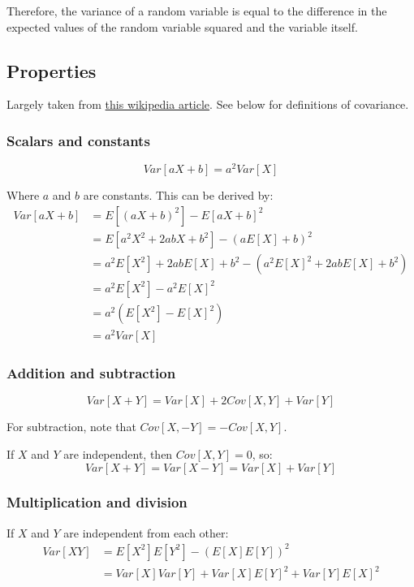 \documentclass[12pt]{article}
\begin{document}
Therefore, the variance of a random variable is equal to the difference in the expected values of the random variable squared and the variable itself.

\subsection{Properties}

Largely taken from \href{https://en.wikipedia.org/wiki/Algebra_of_random_variables}{this wikipedia article}. See below for definitions of covariance.

\subsubsection{Scalars and constants}
$$ Var[aX + b] = a^2 Var[X] $$
    
Where $a$ and $b$ are constants.
This can be derived by:
\begin{align*}
    Var[aX + b] &= E[(aX + b)^2] - E[aX + b]^2 \\
    &= E[a^2 X^2 + 2abX + b^2] - (aE[X] + b)^2 \\
    &= a^2 E[X^2] + 2abE[X] + b^2 - (a^2 E[X]^2 + 2abE[X] + b^2) \\
    &= a^2 E[X^2] - a^2 E[X]^2 \\
    &= a^2 (E[X^2] - E[X]^2) \\
    &= a^2 Var[X]
\end{align*}

\subsubsection{Addition and subtraction}
$$ Var[X + Y] = Var[X] + 2 Cov[X,Y] + Var[Y] $$

For subtraction, note that $Cov[X,-Y] = - Cov[X,Y]$.

If $X$ and $Y$ are independent, then $Cov[X,Y]=0$, so:
$$ Var[X + Y] = Var[X - Y] = Var[X] + Var[Y] $$

\subsubsection{Multiplication and division}
If $X$ and $Y$ are independent from each other:
\begin{align*}
    Var[X Y] &= E[X^2] E[Y^2] - (E[X] E[Y])^2 \\
    &= Var[X] Var[Y] + Var[X] E[Y]^2 + Var[Y] E[X]^2
\end{align*}
\end{document}
